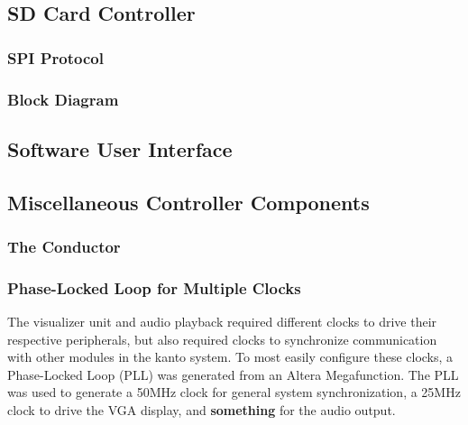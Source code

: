\documentclass{article}
\begin{document}
\subsection{SD Card Controller}
	\subsubsection{SPI Protocol}
	\subsubsection{Block Diagram}
	


\subsection{Software User Interface}

\subsection{Miscellaneous Controller Components}
\subsubsection{The Conductor}
\subsubsection{Phase-Locked Loop for Multiple Clocks}
The visualizer unit and audio playback required different clocks to drive their respective peripherals, but also required clocks to synchronize communication with other modules in the kanto system. To most easily configure these clocks, a Phase-Locked Loop (PLL) was generated from an Altera Megafunction. The PLL was used to generate a 50MHz clock for general system synchronization, a 25MHz clock to drive the VGA display, and \textbf{something} for the audio output. %
\end{document}
